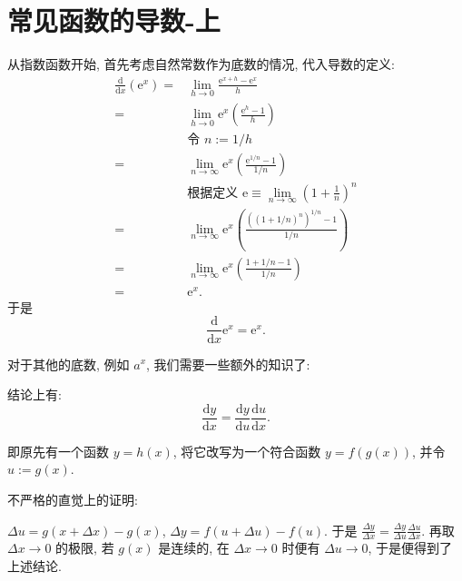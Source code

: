 \section{常见函数的导数-上}\label{013}

\begin{tcolorbox}[size=fbox, breakable, enhanced jigsaw, title={指数函数}]

从指数函数开始, 首先考虑自然常数作为底数的情况, 代入导数的定义:
\begin{align*}
\frac{\mathrm{d}}{\mathrm{d}x}(\mathrm{e}^x)=&\lim_{h\rightarrow0}\frac{\mathrm{e}^{x+h}-\mathrm{e}^x}{h}\\
=&\lim_{h\rightarrow0}\mathrm{e}^x\left(\frac{\mathrm{e}^h-1}{h}\right)\\
&\text{令 }n:=1/h\\
=&\lim_{n\rightarrow\infty}\mathrm{e}^x\left(\frac{\mathrm{e}^{1/n}-1}{1/n}\right)\\
&\text{根据定义 }\mathrm{e}\equiv\lim_{n\rightarrow\infty}\left(1+\frac{1}{n}\right)^n\\
=&\lim_{n\rightarrow\infty}\mathrm{e}^x\left(\frac{{\left(\left(1+1/n\right)^n\right)}^{1/n}-1}{1/n}\right)\\
=&\lim_{n\rightarrow\infty}\mathrm{e}^x\left(\frac{1+1/n-1}{1/n}\right)\\
=&\mathrm{e}^x.
\end{align*}
于是
\begin{equation*}
    \boxed{\frac{\mathrm{d}}{\mathrm{d}x}\mathrm{e}^x=\mathrm{e}^x}.
\end{equation*}

对于其他的底数, 例如 $a^x$, 我们需要一些额外的知识了:

\begin{tcolorbox}[size=fbox, breakable, enhanced jigsaw, title={链式法则 chain rule}]

结论上有: 
\begin{equation*}
    \boxed{\frac{\mathrm{d}y}{\mathrm{d}x}=\frac{\mathrm{d}y}{\mathrm{d}u}\frac{\mathrm{d}u}{\mathrm{d}x}}.
\end{equation*}

\end{tcolorbox}

\begin{newquote}
即原先有一个函数 $y=h(x)$, 将它改写为一个符合函数 $y=f(g(x))$, 并令
$u:=g(x)$.

不严格的直觉上的证明:

$\Delta u=g(x+\Delta x)-g(x)$, $\Delta y=f(u+\Delta u)-f(u)$. 于是
$\frac{\Delta y}{\Delta x}=\frac{\Delta y}{\Delta u}\frac{\Delta u}{\Delta x}$.
再取 $\Delta x\rightarrow0$ 的极限, 若 $g(x)$ 是连续的, 在
$\Delta x\rightarrow0$ 时便有 $\Delta u\rightarrow 0$,
于是便得到了上述结论.
\end{newquote}


\end{tcolorbox}
